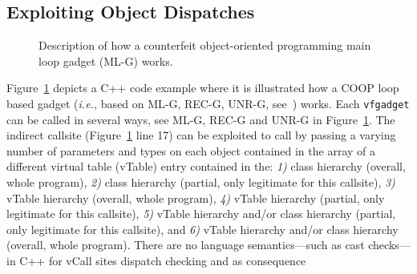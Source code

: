 \subsection{Exploiting Object Dispatches}
\label{Exploiting Polymorphism Weaknesses}
 \begin{figure}[!h]
   \vspace{-.45cm}
   \centering
\vspace{-2.6cm}
\caption{Description of how a counterfeit object-oriented programming main loop gadget (ML-G) works.}
\label{Code example used to illustrate how a COOP loop gadget works}
\end{figure}
Figure~\ref{Code example used to illustrate how a COOP loop gadget works}
depicts a C++ code example where it is illustrated how a COOP loop based gadget 
(\textit{i.e.,} based on ML-G, REC-G, UNR-G, see~\cite{crane:readactor++}) works.
Each \texttt{vfgadget}  can be called in several ways, see ML-G, REC-G and UNR-G in 
Figure~\ref{Code example used to illustrate how a COOP loop gadget works}.
The indirect callsite (Figure~\ref{Code example used to illustrate how a COOP loop gadget works} line 17) can be exploited 
to call by passing a varying number of parameters and types on each object contained in the array of a different
virtual table (vTable) entry contained in the:
\textit{1)} class hierarchy (overall, whole program),
\textit{2)} class hierarchy (partial, only legitimate for this callsite),
\textit{3)} vTable hierarchy (overall, whole program),
\textit{4)} vTable hierarchy (partial, only legitimate for this callsite),
\textit{5)} vTable hierarchy and/or class hierarchy (partial, only legitimate for this callsite), and
\textit{6)} vTable hierarchy and/or class hierarchy (overall, whole program).
There are no language semantics---such as cast checks---in C++ for vCall sites dispatch checking and as consequence
